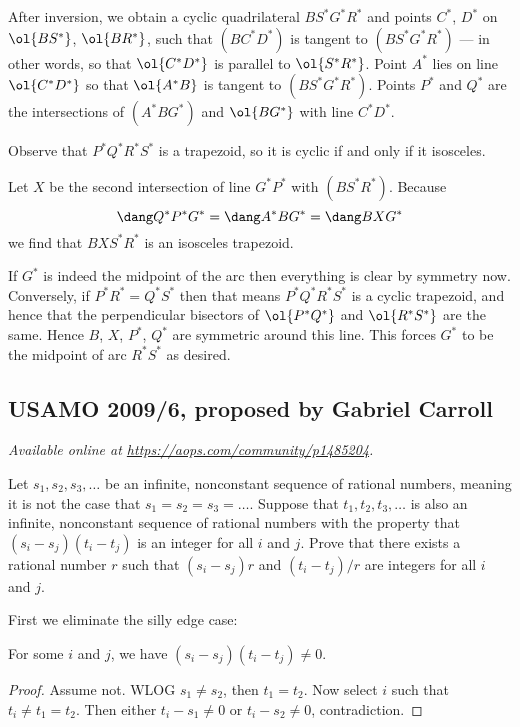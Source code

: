\documentclass[11pt]{scrartcl}
\begin{document}
After inversion, we obtain a cyclic quadrilateral
$BS^\ast G^\ast R^\ast$ and points $C^\ast$, $D^\ast$
on $\ol{BS^\ast}$, $\ol{BR^\ast}$,
such that $(BC^\ast D^\ast)$ is tangent to $(BS^\ast G^\ast R^\ast)$ ---
in other words, so that $\ol{C^\ast D^\ast}$
is parallel to $\ol{S^\ast R^\ast}$.
Point $A^\ast$ lies on line $\ol{C^\ast D^\ast}$
so that $\ol{A^\ast B}$ is tangent to $(BS^\ast G^\ast R^\ast)$.
Points $P^\ast$ and $Q^\ast$ are the
intersections of $(A^\ast BG^\ast)$ and $\ol{BG^\ast}$
with line $C^\ast D^\ast$.

Observe that $P^\ast Q^\ast R^\ast S^\ast$ is a trapezoid,
so it is cyclic if and only if it isosceles.

Let $X$ be the second intersection of line $G^\ast P^\ast$
with $(B S^\ast R^\ast)$.  Because
\[ \dang Q^\ast P^\ast G^\ast
  = \dang A^\ast B G^\ast = \dang BXG^\ast \]
we find that $BXS^\ast R^\ast$ is an isosceles trapezoid.

If $G^\ast$ is indeed the midpoint of the arc
then everything is clear by symmetry now.
Conversely, if $P^\ast R^\ast = Q^\ast S^\ast$ then
that means $P^\ast Q^\ast R^\ast S^\ast$ is a cyclic trapezoid,
and hence that the perpendicular bisectors of
$\ol{P^\ast Q^\ast}$ and $\ol{R^\ast S^\ast}$ are the same.
Hence $B$, $X$, $P^\ast$, $Q^\ast$ are symmetric around this line.
This forces $G^\ast$ to be the midpoint of arc $R^\ast S^\ast$ as desired.
\pagebreak

\subsection{USAMO 2009/6, proposed by Gabriel Carroll}
\textsl{Available online at \url{https://aops.com/community/p1485204}.}
\begin{mdframed}[style=mdpurplebox,frametitle={Problem statement}]
Let $s_1, s_2, s_3, \dots$ be an infinite,
nonconstant sequence of rational numbers,
meaning it is not the case that $s_1 = s_2 = s_3 = \dots$.
Suppose that $t_1, t_2, t_3, \dots$ is also an infinite,
nonconstant sequence of rational numbers
with the property that $(s_i - s_j)(t_i - t_j)$
is an integer for all $i$ and $j$.
Prove that there exists a rational number $r$
such that $(s_i - s_j)r$ and $(t_i - t_j)/r$
are integers for all $i$ and $j$.
\end{mdframed}
First we eliminate the silly edge case:
\begin{claim*}
  For some $i$ and $j$, we have
  $(s_i - s_j)(t_i - t_j) \neq 0$.
\end{claim*}
\begin{proof}
  Assume not.
  WLOG $s_1 \neq s_2$, then $t_1 = t_2$.
  Now select $i$ such that $t_i \neq t_1 = t_2$.
  Then either $t_i - s_1 \neq 0$
  or $t_i - s_2 \neq 0$, contradiction.
\end{proof}
\end{document}
